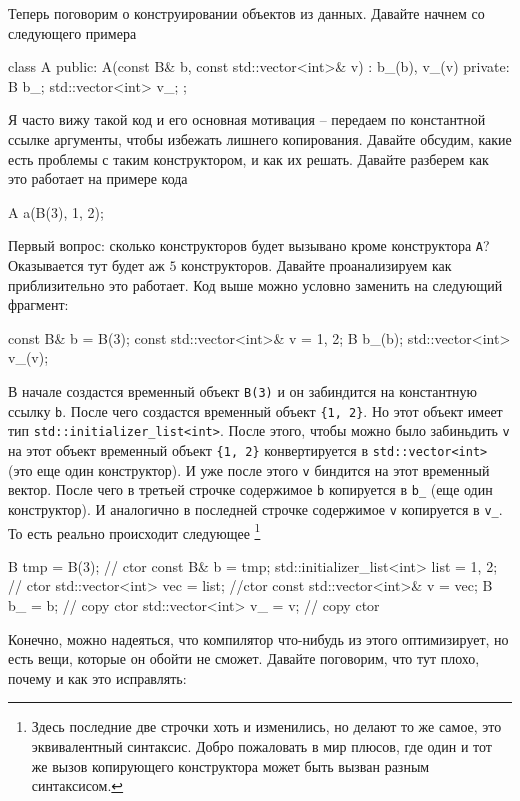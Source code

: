 Теперь поговорим о конструировании объектов из данных.
Давайте начнем со следующего примера
\begin{cppcode}
class A {
public:
  A(const B& b, const std::vector<int>& v)
   : b_(b), v_(v) {}
private:
  B b_;
  std::vector<int> v_;
};
\end{cppcode}
Я часто вижу такой код и его основная мотивация -- передаем по константной ссылке аргументы, чтобы избежать лишнего копирования.
Давайте обсудим, какие есть проблемы с таким конструктором, и как их решать.
Давайте разберем как это работает на примере кода
\begin{cppcode}
A a(B(3), {1, 2});
\end{cppcode}
Первый вопрос: сколько конструкторов будет вызывано кроме конструктора \verb"A"?
Оказывается тут будет аж $5$ конструкторов.
Давайте проанализируем как приблизительно это работает.
Код выше можно условно заменить на следующий фрагмент:
\begin{cppcode}
const B& b = B(3);
const std::vector<int>& v = {1, 2};
B b_(b);
std::vector<int> v_(v);
\end{cppcode}
В начале создастся временный объект \verb"B(3)" и он забиндится на константную ссылку \verb"b".
После чего создастся временный объект \verb"{1, 2}".
Но этот объект имеет тип \verb"std::initializer_list<int>".
После этого, чтобы можно было забиньдить \verb"v" на этот объект временный объект \verb"{1, 2}" конвертируется в \verb"std::vector<int>" (это еще один конструктор).
И уже после этого \verb"v" биндится на этот временный вектор.
После чего в третьей строчке содержимое \verb"b" копируется в \verb"b_" (еще один конструктор).
И аналогично в последней строчке содержимое \verb"v" копируется в \verb"v_".
То есть реально происходит следующее%
\footnote{Здесь последние две строчки хоть и изменились, но делают то же самое, это эквивалентный синтаксис.
Добро пожаловать в мир плюсов, где один и тот же вызов копирующего конструктора может быть вызван разным синтаксисом.}
\begin{cppcode}
B tmp = B(3); // ctor
const B& b = tmp;
std::initializer_list<int> list = {1, 2}; // ctor
std::vector<int> vec = list; //ctor
const std::vector<int>& v = vec;
B b_ = b; // copy ctor
std::vector<int> v_ = v; // copy ctor
\end{cppcode}
Конечно, можно надеяться, что компилятор что-нибудь из этого оптимизирует, но есть вещи, которые он обойти не сможет.
Давайте поговорим, что тут плохо, почему и как это исправлять:
